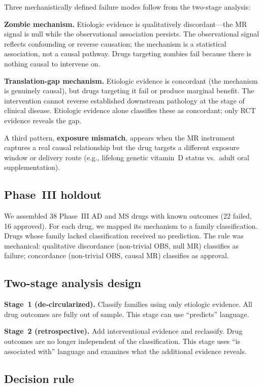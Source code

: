 \documentclass[11pt]{article}
\begin{document}
Three mechanistically defined failure modes follow from the two-stage analysis:

\textbf{Zombie mechanism.} Etiologic evidence is qualitatively discordant---the MR signal is null while the observational association persists. The observational signal reflects confounding or reverse causation; the mechanism is a statistical association, not a causal pathway. Drugs targeting zombies fail because there is nothing causal to intervene on.

\textbf{Translation-gap mechanism.} Etiologic evidence is concordant (the mechanism is genuinely causal), but drugs targeting it fail or produce marginal benefit. The intervention cannot reverse established downstream pathology at the stage of clinical disease. Etiologic evidence alone classifies these as concordant; only RCT evidence reveals the gap.

A third pattern, \textbf{exposure mismatch}, appears when the MR instrument captures a real causal relationship but the drug targets a different exposure window or delivery route (e.g., lifelong genetic vitamin~D status vs.\ adult oral supplementation).

\subsection{Phase~III holdout}

We assembled 38 Phase~III AD and MS drugs with known outcomes (22 failed, 16 approved). For each drug, we mapped its mechanism to a family classification. Drugs whose family lacked classification received no prediction. The rule was mechanical: qualitative discordance (non-trivial OBS, null MR) classifies as failure; concordance (non-trivial OBS, causal MR) classifies as approval.

\subsection{Two-stage analysis design}

\textbf{Stage~1 (de-circularized).} Classify families using only etiologic evidence. All drug outcomes are fully out of sample. This stage can use ``predicts'' language.

\textbf{Stage~2 (retrospective).} Add interventional evidence and reclassify. Drug outcomes are no longer independent of the classification. This stage uses ``is associated with'' language and examines what the additional evidence reveals.

\subsection{Decision rule}
\end{document}
